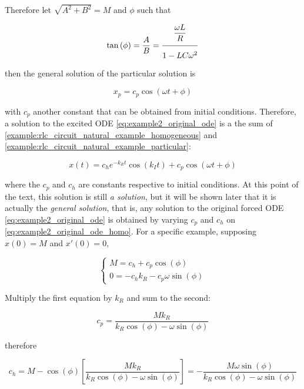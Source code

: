 \begin{example}
	Therefore let $\sqrt{A^2 + B^2} = M$ and $\phi$ such that

\begin{equation} \tan\left(\phi\right) = \dfrac{A}{B} = \xfrac{3mm}{2mm}{\dfrac{\omega L}{R}}{ 1 - LC\omega^2} \end{equation}

	\noindent then the general solution of the particular solution is

\begin{equation} x_p = c_p\cos\left(\omega t + \phi\right) \label{example:rlc_circuit_natural_example_particular} \end{equation}

	\noindent with $c_p$ another constant that can be obtained from initial conditions. Therefore, a solution to the excited ODE \eqref{eq:example2_original_ode} is a the sum of \eqref{example:rlc_circuit_natural_example_homogeneous} and \eqref{example:rlc_circuit_natural_example_particular}:

\begin{equation} x(t) = c_he^{-k_R t} \cos\left(k_I t\right) + c_p\cos\left(\omega t + \phi\right) \label{eq:example2_original_ode_homo}\end{equation}

	\noindent where the $c_p$ and $c_h$ are constants respective to initial conditions. At this point of the text, this solution is still \textit{a solution}, but it will be shown later that it is actually the \textit{general solution}, that is, any solution to the original forced ODE \eqref{eq:example2_original_ode} is obtained by varying $c_p$ and $c_h$ on \eqref{eq:example2_original_ode_homo}. For a specific example, supposing $x(0) = M$ and $x'(0) = 0$,

\begin{equation} \left\{\begin{array}{l} M = c_h + c_p\cos\left(\phi\right) \\[5mm] 0 = -c_hk_R - c_p\omega\sin\left(\phi\right) \end{array}\right. \end{equation}

	Multiply the first equation by $k_R$ and sum to the second:

\begin{equation} c_p = \dfrac{Mk_R}{k_R\cos\left(\phi\right) - \omega\sin\left(\phi\right)} \end{equation}

	\noindent therefore

\begin{equation} c_h = M - \cos\left(\phi\right)\left[\dfrac{Mk_R}{k_R\cos\left(\phi\right) - \omega\sin\left(\phi\right)}\right] = -\dfrac{M\omega \sin\left(\phi\right)}{k_R\cos\left(\phi\right) - \omega\sin\left(\phi\right)}\end{equation}

\examplebar
\end{example} %

